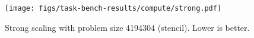 \begin{figure}[t]
\centering
\texttt{[image: figs/task-bench-results/compute/strong.pdf]}
\vspace{-0.5cm}
\caption{Strong scaling with problem size 4194304 (stencil). Lower is better.\label{fig:strong-scaling}}
\vspace{-0.05cm}
\end{figure}
